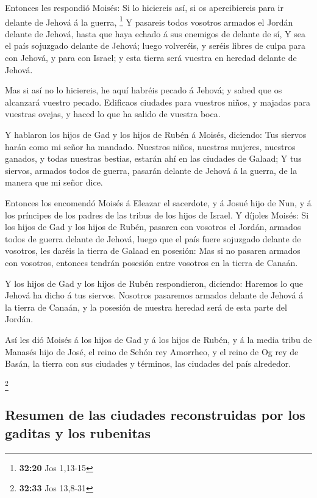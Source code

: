  Entonces les respondió Moisés: Si lo hiciereis así, si
os apercibiereis para ir delante de Jehová á la guerra, \footnote{\textbf{32:20}
  Jos 1,13-15}  Y pasareis todos vosotros armados el
Jordán delante de Jehová, hasta que haya echado á sus enemigos de
delante de sí,  Y sea el país sojuzgado delante de
Jehová; luego volveréis, y seréis libres de culpa para con Jehová, y
para con Israel; y esta tierra será vuestra en heredad delante de
Jehová.

 Mas si así no lo hiciereis, he aquí habréis pecado á
Jehová; y sabed que os alcanzará vuestro pecado. 
Edificaos ciudades para vuestros niños, y majadas para vuestras ovejas,
y haced lo que ha salido de vuestra boca.

 Y hablaron los hijos de Gad y los hijos de Rubén á
Moisés, diciendo: Tus siervos harán como mi señor ha mandado.
 Nuestros niños, nuestras mujeres, nuestros ganados, y
todas nuestras bestias, estarán ahí en las ciudades de Galaad;
 Y tus siervos, armados todos de guerra, pasarán delante
de Jehová á la guerra, de la manera que mi señor dice.

 Entonces los encomendó Moisés á Eleazar el sacerdote, y
á Josué hijo de Nun, y á los príncipes de los padres de las tribus de
los hijos de Israel.  Y díjoles Moisés: Si los hijos de
Gad y los hijos de Rubén, pasaren con vosotros el Jordán, armados todos
de guerra delante de Jehová, luego que el país fuere sojuzgado delante
de vosotros, les daréis la tierra de Galaad en posesión: 
Mas si no pasaren armados con vosotros, entonces tendrán posesión entre
vosotros en la tierra de Canaán.

 Y los hijos de Gad y los hijos de Rubén respondieron,
diciendo: Haremos lo que Jehová ha dicho á tus siervos. 
Nosotros pasaremos armados delante de Jehová á la tierra de Canaán, y la
posesión de nuestra heredad será de esta parte del Jordán.

 Así les dió Moisés á los hijos de Gad y á los hijos de
Rubén, y á la media tribu de Manasés hijo de José, el reino de Sehón rey
Amorrheo, y el reino de Og rey de Basán, la tierra con sus ciudades y
términos, las ciudades del país alrededor.

\footnote{\textbf{32:33} Jos 13,8-31}

\hypertarget{resumen-de-las-ciudades-reconstruidas-por-los-gaditas-y-los-rubenitas}{%
\subsection{Resumen de las ciudades reconstruidas por los gaditas y los
rubenitas}\label{resumen-de-las-ciudades-reconstruidas-por-los-gaditas-y-los-rubenitas}}

